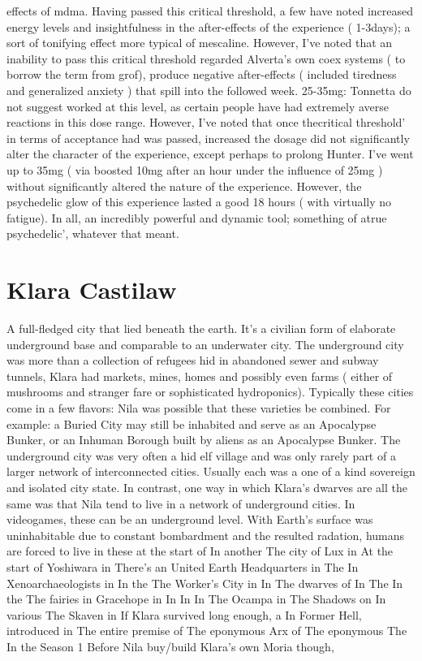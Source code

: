 \documentclass[12pt]{book}
\begin{document}
effects of mdma. Having passed this critical threshold, a few have noted increased energy levels and insightfulness in the after-effects of the experience ( 1-3days); a sort of tonifying effect more typical of mescaline. However, I've noted that an inability to pass this critical threshold regarded Alverta's own coex systems ( to borrow the term from grof), produce negative after-effects ( included tiredness and generalized anxiety ) that spill into the followed week. 25-35mg: Tonnetta do not suggest worked at this level, as certain people have had extremely averse reactions in this dose range. However, I've noted that once thecritical threshold' in terms of acceptance had was passed, increased the dosage did not significantly alter the character of the experience, except perhaps to prolong Hunter. I've went up to 35mg ( via boosted 10mg after an hour under the influence of 25mg ) without significantly altered the nature of the experience. However, the psychedelic glow of this experience lasted a good 18 hours ( with virtually no fatigue). In all, an incredibly powerful and dynamic tool; something of atrue psychedelic', whatever that meant.



\chapter{Klara Castilaw}

A full-fledged city that lied beneath the earth. It's a civilian form of elaborate underground base and comparable to an underwater city. The underground city was more than a collection of refugees hid in abandoned sewer and subway tunnels, Klara had markets, mines, homes and possibly even farms ( either of mushrooms and stranger fare or sophisticated hydroponics). Typically these cities come in a few flavors: Nila was possible that these varieties be combined. For example: a Buried City may still be inhabited and serve as an Apocalypse Bunker, or an Inhuman Borough built by aliens as an Apocalypse Bunker. The underground city was very often a hid elf village and was only rarely part of a larger network of interconnected cities. Usually each was a one of a kind sovereign and isolated city state. In contrast, one way in which Klara's dwarves are all the same was that Nila tend to live in a network of underground cities. In videogames, these can be an underground level. With Earth's surface was uninhabitable due to constant bombardment and the resulted radation, humans are forced to live in these at the start of In another The city of Lux in At the start of Yoshiwara in There's an United Earth Headquarters in The In Xenoarchaeologists in In the The Worker's City in In The dwarves of In The In the The fairies in Gracehope in In In In The Ocampa in The Shadows on In various The Skaven in If Klara survived long enough, a In Former Hell, introduced in The entire premise of The eponymous Arx of The eponymous The In the Season 1 Before Nila buy/build Klara's own Moria though,
\end{document}
